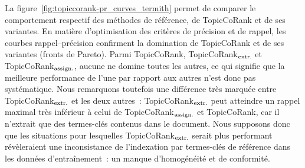         La figure~\ref{fig:topiccorank-pr_curves_termith} permet de comparer le
        comportement respectif des méthodes de référence, de TopicCoRank et de
        ses variantes. En matière d'optimisation des critères de précision et de
        rappel, les courbes rappel--précision confirment la domination de
        TopicCoRank et de ses variantes (fronts de Pareto). Parmi TopicCoRank,
        TopicCoRank$_\textnormal{extr.}$ et TopicCoRank$_\textnormal{assign.}$,
        aucune ne domine toutes les autres, ce qui signifie que la meilleure
        performance de l'une par rapport aux autres n'est donc pas systématique.
        Nous remarquons toutefois une différence très marquée entre
        TopicCoRank$_\textnormal{extr.}$ et les deux autres~:
        TopicCoRank$_\textnormal{extr.}$ peut atteindre un rappel maximal très
        inférieur à celui de TopicCoRank$_\textnormal{assign.}$ et TopicCoRank,
        car il n'extrait que des termes-clés contenus dans le document. Nous
        supposons donc que les situations pour lesquelles
        TopicCoRank$_\textnormal{extr.}$ serait plus performant révèleraient une
        inconsistance de l'indexation par termes-clés de référence dans les
        données d'entraînement~: un manque d'homogénéité et de conformité.
        

